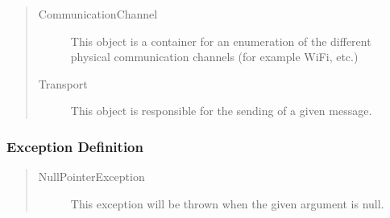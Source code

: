 \begin{quote}
	\begin{description}
		\item[CommunicationChannel] This object is a container for an enumeration of
		the different physical communication channels (for example WiFi, etc.)
		\item[Transport] This object is responsible for the sending of a given
		message.
	\end{description} 
\end{quote}

\subsubsection{Exception Definition} 

\begin{quote}
	\begin{description}
		\item[NullPointerException] This exception will be thrown when the given
		argument is null.
	\end{description} 
\end{quote}